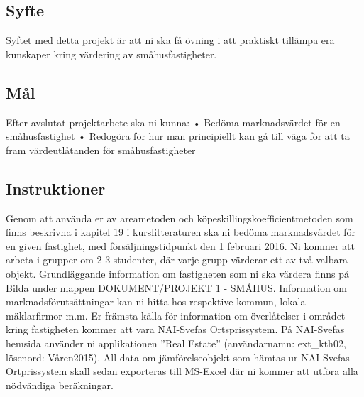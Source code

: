 \documentclass[12pt, a4paper]{article}
\begin{document}
\subsection*{Syfte}

Syftet med detta projekt är att ni ska få övning i att praktiskt tillämpa era kunskaper kring värdering av småhusfastigheter. 

\subsection*{Mål}
Efter avslutat projektarbete ska ni kunna:
•	Bedöma marknadsvärdet för en småhusfastighet
•	Redogöra för hur man principiellt kan gå till väga för att ta fram värdeutlåtanden för småhusfastigheter

\subsection*{Instruktioner}
Genom att använda er av areametoden och köpeskillingskoefficientmetoden som finns beskrivna i kapitel 19 i kurslitteraturen ska ni bedöma marknadsvärdet för en given fastighet, med försäljningstidpunkt den 1 februari 2016.
Ni kommer att arbeta i grupper om 2-3 studenter, där varje grupp värderar ett av två valbara objekt. Grundläggande information om fastigheten som ni ska värdera finns på Bilda under mappen DOKUMENT/PROJEKT 1 - SMÅHUS.
Information om marknadsförutsättningar kan ni hitta hos respektive kommun, lokala mäklarfirmor m.m.
Er främsta källa för information om överlåtelser i området kring fastigheten kommer att vara NAI-Svefas Ortsprissystem. På NAI-Svefas hemsida använder ni applikationen ”Real Estate” (användarnamn: ext_kth02, lösenord: Våren2015). All data om jämförelseobjekt som hämtas ur NAI-Svefas Ortprissystem skall sedan exporteras till MS-Excel där ni kommer att utföra alla nödvändiga beräkningar. 
\end{document}
